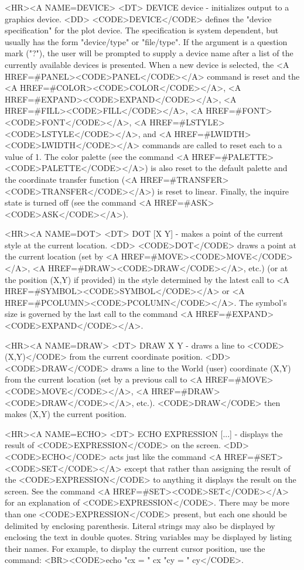 \begin{rawhtml}
<HR><A NAME=DEVICE>
<DT>
DEVICE device - initializes output to a graphics device.
<DD>
	<CODE>DEVICE</CODE> defines the "device specification" for the
	plot device.  The specification is system dependent, but usually
	has the form "device/type" or "file/type".  If the argument is a
	question mark ("?"), the user will be prompted to supply a device
	name after a list of the currently available devices is
	presented.  When a new device is selected, the
	<A HREF=#PANEL><CODE>PANEL</CODE></A> command is reset and the
	<A HREF=#COLOR><CODE>COLOR</CODE></A>,
	<A HREF=#EXPAND><CODE>EXPAND</CODE></A>,
	<A HREF=#FILL><CODE>FILL</CODE></A>,
	<A HREF=#FONT><CODE>FONT</CODE></A>,
	<A HREF=#LSTYLE><CODE>LSTYLE</CODE></A>, and
	<A HREF=#LWIDTH><CODE>LWIDTH</CODE></A> commands are called to reset
	each to a value of 1.  The color palette (see the command
	<A HREF=#PALETTE><CODE>PALETTE</CODE></A>) is also reset to
	the default palette and the coordinate transfer function
	(<A HREF=#TRANSFER><CODE>TRANSFER</CODE></A>) is reset to linear.
	Finally, the inquire state is turned off (see the command
	<A HREF=#ASK><CODE>ASK</CODE></A>).

<HR><A NAME=DOT>
<DT>
DOT [X Y] - makes a point of the current style at the current location.
<DD>
	<CODE>DOT</CODE> draws a point at the current location (set by
	<A HREF=#MOVE><CODE>MOVE</CODE></A>,
	<A HREF=#DRAW><CODE>DRAW</CODE></A>, etc.)
	(or at the position (X,Y) if provided) in the style determined by
	the latest call to <A HREF=#SYMBOL><CODE>SYMBOL</CODE></A> or
	<A HREF=#PCOLUMN><CODE>PCOLUMN</CODE></A>.  The symbol's size is
	governed by the last call to the command
	<A HREF=#EXPAND><CODE>EXPAND</CODE></A>.

<HR><A NAME=DRAW>
<DT>
DRAW X Y - draws a line to <CODE>(X,Y)</CODE> from the current coordinate position.
<DD>
	<CODE>DRAW</CODE> draws a line to the World (user) coordinate (X,Y)
	from the current location (set by a previous call to
	<A HREF=#MOVE><CODE>MOVE</CODE></A>,
	<A HREF=#DRAW><CODE>DRAW</CODE></A>, etc.).
	<CODE>DRAW</CODE> then makes (X,Y) the current position.

<HR><A NAME=ECHO>
<DT>
ECHO EXPRESSION [...] - displays the result of <CODE>EXPRESSION</CODE> on the screen.
<DD>
	<CODE>ECHO</CODE> acts just like the command
	<A HREF=#SET><CODE>SET</CODE></A> except that rather than assigning
	the result of the <CODE>EXPRESSION</CODE> to anything it displays
	the result on the screen.  See the command
	<A HREF=#SET><CODE>SET</CODE></A> for an explanation of
	<CODE>EXPRESSION</CODE>.  There may be more than one
	<CODE>EXPRESSION</CODE> present, but each one should be delimited
	by enclosing parenthesis.  Literal strings may also be displayed
	by enclosing the text in double quotes.  String variables may be
	displayed by listing their names.  For example, to display the
	current cursor position, use the command:
	<BR><CODE>echo "cx = " cx "cy = " cy</CODE>.


\end{rawhtml}
